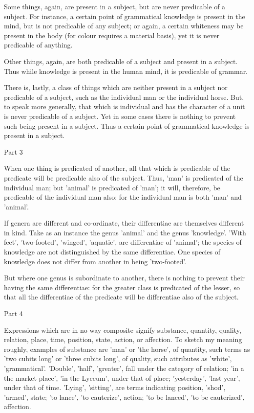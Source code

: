 Some things, again, are present in a subject, but are never predicable
of a subject. For instance, a certain point of grammatical knowledge is
present in the mind, but is not predicable of any subject; or again, a
certain whiteness may be present in the body (for colour requires a
material basis), yet it is never predicable of anything.

Other things, again, are both predicable of a subject and present in a
subject. Thus while knowledge is present in the human mind, it is
predicable of grammar.

There is, lastly, a class of things which are neither present in a
subject nor predicable of a subject, such as the individual man or the
individual horse. But, to speak more generally, that which is
individual and has the character of a unit is never predicable of a
subject. Yet in some cases there is nothing to prevent such being
present in a subject. Thus a certain point of grammatical knowledge is
present in a subject.



Part 3

When one thing is predicated of another, all that which is predicable
of the predicate will be predicable also of the subject. Thus, 'man' is
predicated of the individual man; but 'animal' is predicated of 'man';
it will, therefore, be predicable of the individual man also: for the
individual man is both 'man' and 'animal'.

If genera are different and co-ordinate, their differentiae are
themselves different in kind. Take as an instance the genus 'animal'
and the genus 'knowledge'. 'With feet', 'two-footed', 'winged',
'aquatic', are differentiae of 'animal'; the species of knowledge are
not distinguished by the same differentiae. One species of knowledge
does not differ from another in being 'two-footed'.

But where one genus is subordinate to another, there is nothing to
prevent their having the same differentiae: for the greater class is
predicated of the lesser, so that all the differentiae of the predicate
will be differentiae also of the subject.



Part 4

Expressions which are in no way composite signify substance, quantity,
quality, relation, place, time, position, state, action, or affection.
To sketch my meaning roughly, examples of substance are 'man' or 'the
horse', of quantity, such terms as 'two cubits long' or 'three cubits
long', of quality, such attributes as 'white', 'grammatical'. 'Double',
'half', 'greater', fall under the category of relation; 'in a the
market place', 'in the Lyceum', under that of place; 'yesterday', 'last
year', under that of time. 'Lying', 'sitting', are terms indicating
position, 'shod', 'armed', state; 'to lance', 'to cauterize', action;
'to be lanced', 'to be cauterized', affection.

